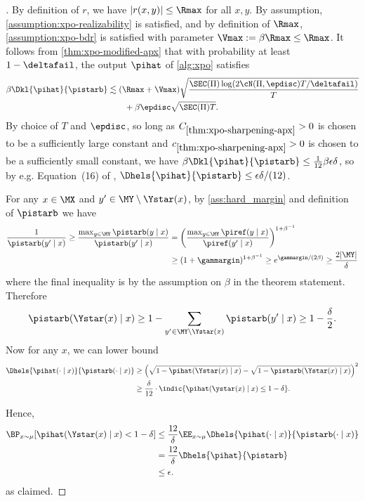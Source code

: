 \begin{proof}[]
By definition of $r$, we have $|r(x,y)| \leq \Rmax$ for all $x,y$. By assumption, \cref{assumption:xpo-realizability} is satisfied, and by definition of $\Rmax$, \cref{assumption:xpo-bdr} is satisfied with parameter $\Vmax := \beta \Rmax \leq \Rmax$. It follows from \cref{thm:xpo-modified-apx} that with probability at least $1-\deltafail$, the output $\pihat$ of \cref{alg:xpo} satisfies
\begin{align} 
\beta\Dkl{\pihat}{\pistarb} &\lesssim (\Rmax+\Vmax)\sqrt{\frac{\SEC(\Pi) \log(2\cN(\Pi,\epdisc)T/\deltafail)}{T}} \\
&\qquad+ \beta\epdisc \sqrt{\SEC(\Pi) T}.
\end{align}
By choice of $T$ and $\epdisc$, so long as $C_{\mathrm{\ref{thm:xpo-sharpening-apx}}}>0$ is chosen to be a sufficiently large constant and $c_{\mathrm{\ref{thm:xpo-sharpening-apx}}}>0$ is chosen to be a sufficiently small constant, we have $\beta\Dkl{\pihat}{\pistarb} \leq \frac{1}{12}\beta\epsilon\delta$, so by e.g. Equation~(16) of \cite{sason2016f}, $\Dhels{\pihat}{\pistarb} \leq \epsilon\delta/(12)$.

For any $x \in \MX$ and $y' \in \MY \setminus \Ystar(x)$, by \cref{ass:hard_margin} and definition of $\pistarb$ we have
\begin{align}
\frac{1}{\pistarb(y'\mid x)} \geq \frac{\max_{y \in \MY} \pistarb(y\mid x)}{\pistarb(y'\mid x)} &= \left(\frac{\max_{y \in \MY} \piref(y\mid x)}{\piref(y'\mid x)}\right)^{1+\beta^{-1}} \\
&\geq (1+\gammargin)^{1+\beta^{-1}} \geq e^{\gammargin/(2\beta)} \geq \frac{2|\MY|}{\delta}
\end{align}
where the final inequality is by the assumption on $\beta$ in the
theorem statement. Therefore
\[\pistarb(\Ystar(x)\mid x) \geq 1 - \sum_{y' \in \MY \setminus \Ystar(x)} \pistarb(y'\mid x) \geq 1-\frac{\delta}{2}.\]
Now for any $x$, we can lower bound
\begin{align}
\Dhels{\pihat(\cdot\mid x)}{\pistarb(\cdot\mid x)}
&\geq \left(\sqrt{1 - \pihat(\Ystar(x)\mid x)} - \sqrt{1 - \pistarb(\Ystar(x)\mid x)}\right)^2 \\ 
&\geq \frac{\delta}{12} \cdot \indic\{\pihat(\ystar(x)\mid x) \leq 1-\delta\}.
\end{align}

Hence,
\begin{align}
\BP_{x\sim\mu}[\pihat(\Ystar(x)\mid x)<1-\delta]
&\leq \frac{12}{\delta} \EE_{x \sim \mu} \Dhels{\pihat(\cdot\mid x)}{\pistarb(\cdot\mid x)} \\ 
&= \frac{12}{\delta} \Dhels{\pihat}{\pistarb} \\ 
&\leq \epsilon.
\end{align}
as claimed.
\end{proof}

